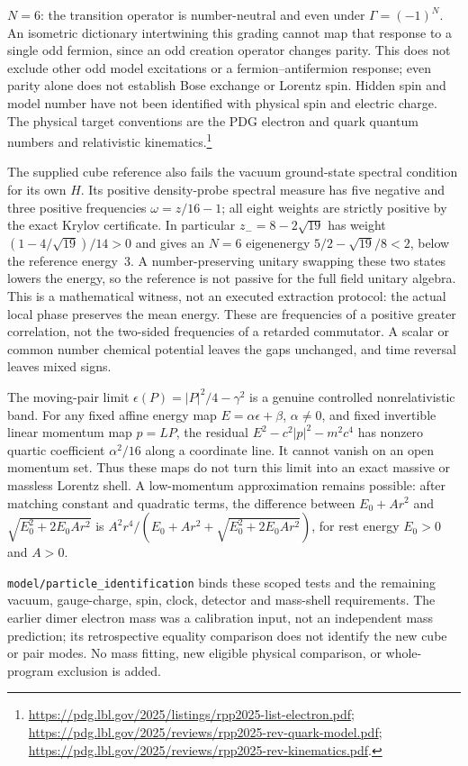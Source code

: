 $N=6$: the transition operator is number-neutral and even under
$\Gamma=(-1)^N$.  An isometric dictionary intertwining this grading cannot
map that response to a single odd fermion, since an odd creation operator
changes parity.  This does not exclude other odd model excitations or a
fermion--antifermion response; even parity alone does not establish Bose
exchange or Lorentz spin.  Hidden spin and model number have not been
identified with physical spin and electric charge.
The physical target conventions are the PDG electron and quark quantum
numbers and relativistic kinematics.\footnote{\url{https://pdg.lbl.gov/2025/listings/rpp2025-list-electron.pdf};
\url{https://pdg.lbl.gov/2025/reviews/rpp2025-rev-quark-model.pdf};
\url{https://pdg.lbl.gov/2025/reviews/rpp2025-rev-kinematics.pdf}.}

The supplied cube reference also fails the vacuum ground-state spectral
condition for its own $H$.  Its positive density-probe spectral measure has
five negative and three positive frequencies $\omega=z/16-1$; all eight
weights are strictly positive by the exact Krylov certificate.  In
particular $z_-=8-2\sqrt{19}$ has weight $(1-4/\sqrt{19})/14>0$ and gives
an $N=6$ eigenenergy $5/2-\sqrt{19}/8<2$, below the reference energy~3.
A number-preserving unitary swapping these two states lowers the energy,
so the reference is not passive for the full field unitary algebra.
This is a mathematical witness, not an executed extraction protocol:
the actual local phase preserves the mean energy.  These are frequencies
of a positive greater correlation, not the two-sided frequencies of a
retarded commutator.  A scalar or common number chemical potential leaves
the gaps unchanged, and time reversal leaves mixed signs.

The moving-pair limit $\epsilon(P)=|P|^2/4-\gamma^2$ is a genuine
controlled nonrelativistic band.  For any fixed affine energy map
$E=\alpha\epsilon+\beta$, $\alpha\ne0$, and fixed invertible linear
momentum map $p=LP$, the residual $E^2-c^2|p|^2-m^2c^4$ has nonzero
quartic coefficient $\alpha^2/16$ along a coordinate line.  It cannot
vanish on an open momentum set.  Thus these maps do not turn this limit
into an exact massive or massless Lorentz shell.  A low-momentum
approximation remains possible: after matching constant and quadratic
terms, the difference between $E_0+Ar^2$ and $\sqrt{E_0^2+2E_0Ar^2}$ is
$A^2r^4/(E_0+Ar^2+\sqrt{E_0^2+2E_0Ar^2})$, for rest energy
$E_0>0$ and $A>0$.

\texttt{model/particle\_identification} binds these scoped tests and the
remaining vacuum, gauge-charge, spin, clock, detector and mass-shell
requirements.  The earlier dimer electron mass was a calibration input,
not an independent mass prediction; its retrospective equality comparison
does not identify the new cube or pair modes.  No mass fitting, new eligible
physical comparison, or whole-program exclusion is added.
